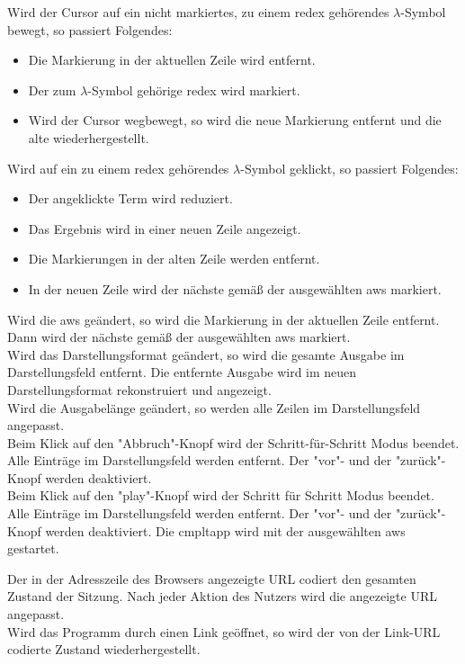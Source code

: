 \documentclass[parskip=full,11pt,twoside]{scrartcl}
\begin{document}
Wird der Cursor auf ein nicht markiertes, zu einem \gls{redex} gehörendes $\lambda$-Symbol bewegt, so passiert Folgendes:
\begin{itemize}
\item Die Markierung in der aktuellen Zeile wird entfernt.
\item Der zum $\lambda$-Symbol gehörige \gls{redex} wird markiert.
\item Wird der Cursor wegbewegt, so wird die neue Markierung entfernt und die alte wiederhergestellt.
\end{itemize}

Wird auf ein zu einem \gls{redex} gehörendes $\lambda$-Symbol geklickt, so passiert Folgendes:
\begin{itemize}
\item Der angeklickte Term wird reduziert.
\item Das Ergebnis wird in einer neuen Zeile angezeigt.
\item Die Markierungen in der alten Zeile werden entfernt.
\item In der neuen Zeile wird der nächste  gemäß der ausgewählten \gls{aws} markiert.
\end{itemize}

Wird die \gls{aws} geändert, so wird die Markierung in der aktuellen Zeile entfernt.
Dann wird der nächste  gemäß der ausgewählten \gls{aws} markiert.\\
Wird das Darstellungsformat geändert, so wird die gesamte Ausgabe im Darstellungsfeld entfernt.
Die entfernte Ausgabe wird im neuen Darstellungsformat rekonstruiert und angezeigt.\\
Wird die Ausgabelänge geändert, so werden alle Zeilen im Darstellungsfeld angepasst.\\
Beim Klick auf den "Abbruch"-Knopf wird der Schritt-für-Schritt Modus beendet.
Alle Einträge im Darstellungsfeld werden entfernt.
Der "vor"- und der "zurück"-Knopf werden deaktiviert.\\
Beim Klick auf den "play"-Knopf wird der Schritt für Schritt Modus beendet.
Alle Einträge im Darstellungsfeld werden entfernt.
Der "vor"- und der "zurück"-Knopf werden deaktiviert.
Die \gls{cmpltapp} wird mit der ausgewählten \gls{aws} gestartet.

Der in der Adresszeile des Browsers angezeigte URL codiert den gesamten Zustand der Sitzung. 
Nach jeder Aktion des Nutzers wird die angezeigte URL angepasst.\\
Wird das Programm durch einen Link geöffnet, so wird der von der Link-URL codierte Zustand wiederhergestellt.
\end{document}

